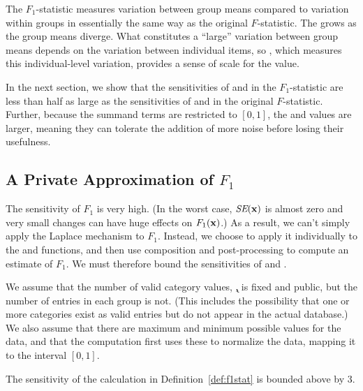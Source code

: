 The $F_1$-statistic measures variation between group means compared to variation within groups in essentially the same way as the original $F$-statistic. The \sa grows as the group means diverge.  What constitutes a ``large'' variation between group means depends on the variation between individual items, so \se, which measures this individual-level variation, provides a sense of scale for the \sa value.


In the next section, we show that the sensitivities of \sa and \se in the $F_1$-statistic are less than half as large as the sensitivities of \ssa and \sse in the original $F$-statistic. Further, because the summand terms are restricted to $[0,1]$, the \sa and \se values are larger, meaning they can tolerate the addition of more noise before losing their usefulness.

\subsection{A Private Approximation of $F_1$}\label{subsec:privf1}

The sensitivity of $F_1$ is very high.  (In the worst case, $\textit{SE}(\mathbf{x})$ is almost zero and very small changes can have huge effects on $F_1(\mathbf{x})$.)  As a result, we can't simply apply the Laplace mechanism to $F_1$.  Instead, we choose to apply it individually to the \sa and \se functions, and then use composition and post-processing to compute an estimate of $F_1$.  We must therefore bound the sensitivities of \sa and \se.

We assume that the number of valid category values, \k, is fixed and public, but the number of entries in each group is not.  (This includes the possibility that one or more categories exist as valid entries but do not appear in the actual database.)   We also assume that there are maximum and minimum possible values for the data, and that the computation first uses these to normalize the data, mapping it to the interval $[0,1]$.

\begin{theorem}[SE Sensitivity] \label{thm:SEsens}
The sensitivity of the \se calculation in Definition~\ref{def:f1stat} is bounded above by 3.
\end{theorem}

